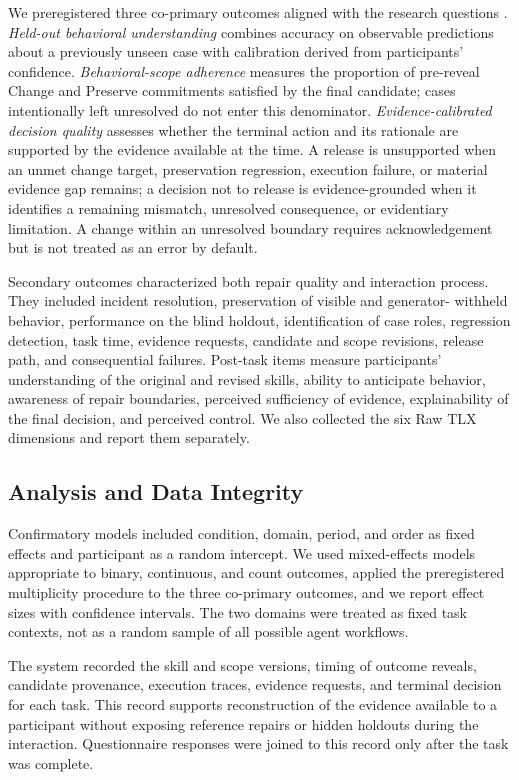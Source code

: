 We preregistered three co-primary outcomes aligned with the research questions
.
\emph{Held-out behavioral understanding} combines accuracy on observable
predictions about a previously unseen case with calibration derived from
participants' confidence. \emph{Behavioral-scope adherence} measures the
proportion of pre-reveal Change and Preserve commitments satisfied by the final
candidate; cases intentionally left unresolved do not enter this denominator.
\emph{Evidence-calibrated decision quality} assesses whether the terminal
action and its rationale are supported by the evidence available at the time.
A release is unsupported when an unmet change target, preservation regression,
execution failure, or material evidence gap remains; a decision not to release
is evidence-grounded when it identifies a remaining mismatch, unresolved
consequence, or evidentiary limitation. A change within an unresolved boundary
requires acknowledgement but is not treated as an error by default.

Secondary outcomes characterized both repair quality and interaction process.
They included incident resolution, preservation of visible and generator-
withheld behavior, performance on the blind holdout, identification of case
roles, regression detection, task time, evidence requests, candidate and scope
revisions, release path, and consequential failures. Post-task items measure
participants' understanding of the original and revised skills, ability to
anticipate behavior, awareness of repair boundaries, perceived sufficiency of
evidence, explainability of the final decision, and perceived control. We also
collected the six Raw TLX dimensions and report them separately.

\subsection{Analysis and Data Integrity}

Confirmatory models included condition, domain, period, and order as fixed
effects and participant as a random intercept. We used mixed-effects models
appropriate to binary, continuous, and count outcomes, applied the
preregistered multiplicity procedure to the three co-primary outcomes, and we
report effect sizes with confidence intervals. The two domains were treated as
fixed task contexts, not as a random sample of all possible agent workflows.

The system recorded the skill and scope versions, timing of outcome reveals,
candidate provenance, execution traces, evidence requests, and terminal
decision for each task. This record supports reconstruction of the evidence
available to a participant without exposing reference repairs or hidden
holdouts during the interaction. Questionnaire responses were joined to this
record only after the task was complete.

